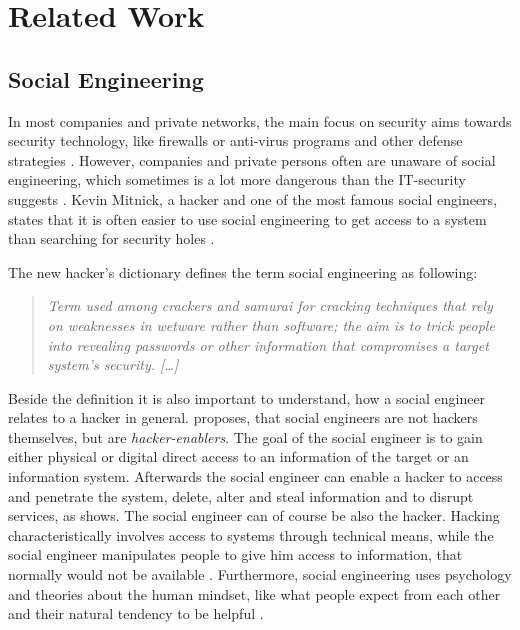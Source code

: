 \chapter{Related Work}
\label{chapter:relatedwork}

\section{Social Engineering}

In most companies and private networks, the main focus on security aims towards
security technology, like firewalls or anti-virus programs and other defense
strategies \cite{winkler1995}. However, companies and private persons often are unaware of social
engineering, which sometimes is a lot more dangerous than the IT-security
suggests \cite{jones2004}. Kevin Mitnick, a hacker and one of the most famous social
engineers, states that it is often easier to use social engineering to get
access to a system than searching for security holes \cite{mitnick2003}.


The new hacker's dictionary \cite{raymond1996} defines the term social engineering as
following:
\begin{quote}
\textit{Term used among crackers and samurai for cracking techniques that rely on
weaknesses in wetware rather than software; the aim is to trick people into
revealing passwords or other information that compromises a target system's
security. [\dots]}
\end{quote}

Beside the definition it is also important to understand, how a social engineer
relates to a hacker in general. \cite{thornburgh2004} proposes, that social
engineers are not hackers themselves, but are \textit{hacker-enablers}.  The
goal of the social engineer is to gain either physical or digital direct access
to an information of the target or an information system.  Afterwards the
social engineer can enable a hacker to access and penetrate the system, delete,
alter and steal information and to disrupt services, as \cite{thornburgh2004}
shows. The social engineer can of course be also the hacker. Hacking
characteristically involves access to systems through technical means, while
the social engineer manipulates people to give him access to information, that
normally would not be available \cite{jones2004}.  Furthermore, social
engineering uses psychology and theories about the human mindset, like what
people expect from each other and their natural tendency to be helpful
\cite{jones2004}.


